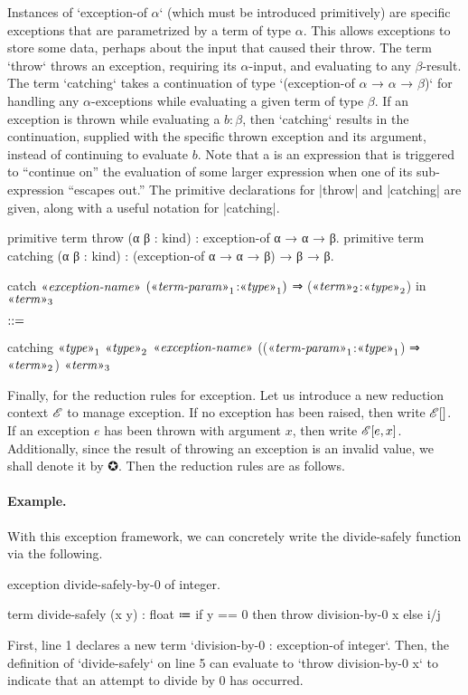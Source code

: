 Instances of \code`exception-of $α$` (which must be introduced primitively) are specific exceptions that are parametrized by a term of type $α$. This allows exceptions to store some data, perhaps about the input that caused their throw.
The term \code`throw` throws an exception, requiring its $α$-input, and evaluating to any $β$-result.
The term \code`catching` takes a continuation of type \code`(exception-of $α$ → $α$ → $β$)` for handling any $α$-exceptions while evaluating a given term of type $β$.
If an exception is thrown while evaluating a $b:β$, then \code`catching` results in the continuation, supplied with the specific thrown exception and its argument, instead of continuing to evaluate $b$.
Note that a  is an expression that is triggered to ``continue on'' the evaluation of some larger expression when one of its sub-expression ``escapes out.''
The primitive declarations for \code|throw| and \code|catching| are given, along with a useful notation for \code|catching|.
%
\begin{program}[caption={Definitions for exception}]
primitive term throw    (α β : kind) : exception-of α → α → β.
primitive term catching (α β : kind) : (exception-of α → α → β) → β → β.
\end{program}
%
\begin{notational}[caption={Notation for exception}]
catch { $\mvar{exception-name}$ $(\mvar{term-param}_1$:$\mvar{type}_1)$ ⇒ ($\mvar{term}_2$:$\mvar{type}_2$) }
  in $\mvar{term}_3$

$\syneq$

catching $\mvar{type}_1$ $\mvar{type}_2$
  $\mvar{exception-name}$
  (($\mvar{term-param}_1$:$\mvar{type}_1$) ⇒ $\mvar{term}_2$)
  $\mvar{term}_3$
\end{notational}

Finally, for the reduction rules for exception.
Let us introduce a new reduction context $\exctx$ to manage exception.
If no exception has been raised, then write $\noexception$.
If an exception $e$ has been thrown with argument $x$, then write $\exception{e, x}$.
Additionally, since the result of throwing an exception is an invalid value, we shall denote it by ✪.
Then the reduction rules are as follows.
%

%
\paragraph{Example.}
With this exception framework, we can concretely write the divide-safely function via the following.
\begin{snippet}[numbers=left]
exception divide-safely-by-0 of integer.

term divide-safely (x y) : float
  ≔ if y == 0
      then throw division-by-0 x
      else i/j
\end{snippet}
First, line 1 declares a new term \code`division-by-0 : exception-of integer`.
Then, the definition of \code`divide-safely` on line 5 can evaluate to \code`throw division-by-0 x` to indicate that an attempt to divide by $0$ has occurred.

